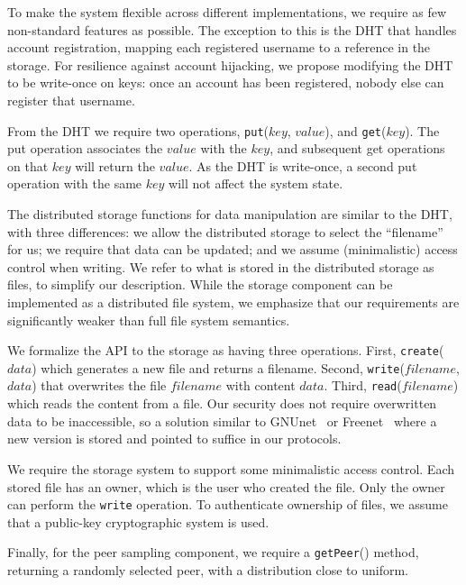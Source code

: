 To make the system flexible across different implementations, we require as few non-standard features as
possible. The exception to this is the DHT that handles
account registration, mapping each registered username to a reference
in the storage.  For resilience against account hijacking,
we propose modifying the DHT to be write-once on keys:
once an account has been registered, nobody else can register that
username.

From the DHT we require two operations, \texttt{put}($key$, $value$), and
\texttt{get}($key$). The put operation associates the $value$ with the
$key$, and subsequent get operations on that $key$ will return the $value$.
As the DHT is write-once, a second put operation with the same $key$ will not
affect the system state.

The distributed storage functions for data
manipulation are similar to the DHT, with three
differences: we allow the distributed storage to select the ``filename'' for
us; we require that data can be updated; and we assume (minimalistic) access
control when writing. We refer to what is stored in the distributed storage as
files, to simplify our description. While the storage component
can be implemented as a distributed file system, we emphasize that our
requirements are significantly weaker than full file system semantics.

We formalize the API to the storage as having three
operations. First, \texttt{create}($data$) which generates a new file and
returns a filename. Second, \texttt{write}($filename$, $data$) that
overwrites the file $filename$ with content $data$. Third,
\texttt{read}($filename$) which reads the content from a file. Our security
does not require overwritten data to be inaccessible, so a solution
similar to GNUnet~\cite{Bennett03} or
Freenet~\cite{Clarke10} where a new version is stored and
pointed to suffice in our protocols.

We require the storage system to support some minimalistic access control.
Each stored file has an owner, which is the user who created the file.  Only
the owner can perform the \texttt{write} operation. To authenticate ownership
of files, we assume that a public-key cryptographic system is used.

Finally, for the peer sampling component, we require a \texttt{getPeer}() method,
returning a randomly selected peer, with a distribution close to uniform.

